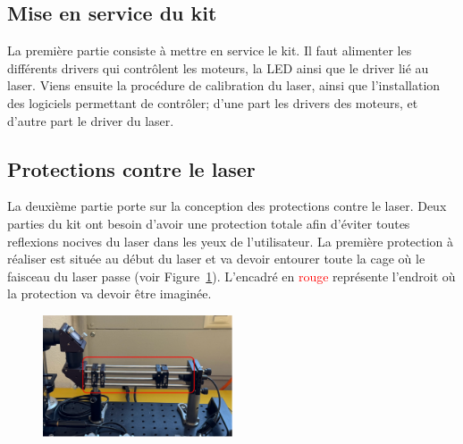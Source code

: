 \subsection{Mise en service du kit}

La première partie consiste à mettre en service le kit. Il faut alimenter les différents drivers qui contrôlent les moteurs, la LED ainsi que le driver lié au laser. Viens ensuite la procédure de calibration du laser, ainsi que l'installation des logiciels permettant de contrôler; d'une part les drivers des moteurs, et d'autre part le driver du laser.

\begin{minipage}{\textwidth}
    \subsection{Protections contre le laser}
    La deuxième partie porte sur la conception des protections contre le laser. Deux parties du kit ont besoin d'avoir une protection totale afin d'éviter toutes reflexions nocives du laser dans les yeux de l'utilisateur. La première protection à réaliser est située au début du laser et va devoir entourer toute la cage où le faisceau du laser passe (voir Figure~\ref{protection_laser_début}). L'encadré en \textcolor{red}{rouge} représente l'endroit où la protection va devoir être imaginée.

    \begin{figure}[H]
        \begin{center}
            \includegraphics[width=0.5\textwidth]{assets/figures/Introduction/protection_debut_laser.png}
        \end{center}
        \label{protection_laser_début}
    \end{figure}
\end{minipage}

